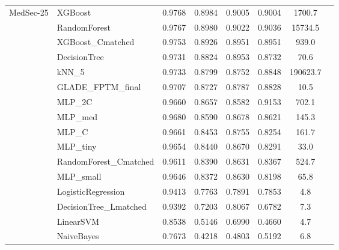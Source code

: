 \documentclass[journal,10pt]{IEEEtran}
\begin{document}
\begin{longtable}{llcccccr}
\multirow{16}{*}{MedSec-25}
 & XGBoost                & 0.9768 & 0.8984 & 0.9005 & 0.9004 & 1700.7   \\
 & RandomForest           & 0.9767 & 0.8980 & 0.9022 & 0.9036 & 15734.5  \\
 & XGBoost\_Cmatched      & 0.9753 & 0.8926 & 0.8951 & 0.8951 & 939.0    \\
 & DecisionTree           & 0.9731 & 0.8824 & 0.8953 & 0.8732 & 70.6     \\
 & kNN\_5                 & 0.9733 & 0.8799 & 0.8752 & 0.8848 & 190623.7 \\
 & GLADE\_FPTM\_final     & 0.9707 & 0.8727 & 0.8787 & 0.8828 & 10.5     \\
 & MLP\_2C                & 0.9660 & 0.8657 & 0.8582 & 0.9153 & 702.1    \\
 & MLP\_med               & 0.9680 & 0.8590 & 0.8678 & 0.8621 & 145.3    \\
 & MLP\_C                 & 0.9661 & 0.8453 & 0.8755 & 0.8254 & 161.7    \\
 & MLP\_tiny              & 0.9654 & 0.8440 & 0.8670 & 0.8291 & 33.0     \\
 & RandomForest\_Cmatched & 0.9611 & 0.8390 & 0.8631 & 0.8367 & 524.7    \\
 & MLP\_small             & 0.9646 & 0.8372 & 0.8630 & 0.8198 & 65.8     \\
 & LogisticRegression     & 0.9413 & 0.7763 & 0.7891 & 0.7853 & 4.8      \\
 & DecisionTree\_Lmatched & 0.9392 & 0.7203 & 0.8067 & 0.6782 & 7.3      \\
 & LinearSVM              & 0.8538 & 0.5146 & 0.6990 & 0.4660 & 4.7      \\
 & NaiveBayes             & 0.7673 & 0.4218 & 0.4803 & 0.5192 & 6.8      \\
\midrule


\end{longtable}
\end{document}

